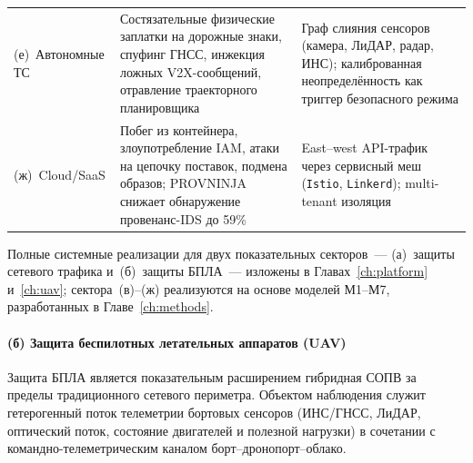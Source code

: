 \begin{table}[htbp]
\begin{tabular}{p{2.8cm} p{6.5cm} p{5.0cm}}
\addlinespace
(е)~Автономные ТС & Состязательные физические заплатки на дорожные знаки, спуфинг ГНСС, инжекция ложных V2X-сообщений, отравление траекторного планировщика & Граф слияния сенсоров (камера, ЛиДАР, радар, ИНС); калиброванная неопределённость как триггер безопасного режима \\
\addlinespace
(ж)~Cloud/SaaS & Побег из контейнера, злоупотребление IAM, атаки на цепочку поставок, подмена образов; PROVNINJA~\cite{PROVNINJA2023} снижает обнаружение провенанс-IDS до 59\% & East--west API-трафик через сервисный меш (\texttt{Istio}, \texttt{Linkerd}); multi-tenant изоляция \\
\bottomrule
\end{tabular}
\end{table}

Полные системные реализации для двух показательных секторов~--- (а)~защиты сетевого трафика и~(б)~защиты БПЛА~--- изложены в Главах~\ref{ch:platform} и~\ref{ch:uav}; сектора~(в)--(ж) реализуются на основе моделей М1--М7, разработанных в Главе~\ref{ch:methods}.

\label{subsubsec:sector_nids}%
\label{subsubsec:sector_uav}%
\label{subsubsec:sector_fintech}%
\label{subsubsec:sector_medical}%
\label{subsubsec:sector_iiot}%
\label{subsubsec:sector_av}%
\label{subsubsec:sector_cloud}%

\paragraph{(б) Защита беспилотных летательных аппаратов (UAV)}\label{subsubsec:sector_uav}

Защита БПЛА является показательным расширением гибридная СОПВ за
пределы традиционного сетевого периметра. Объектом наблюдения служит
гетерогенный поток телеметрии бортовых сенсоров (ИНС/ГНСС, ЛиДАР,
оптический поток, состояние двигателей и полезной нагрузки) в
сочетании с командно-телеметрическим каналом борт--дронопорт--облако.

